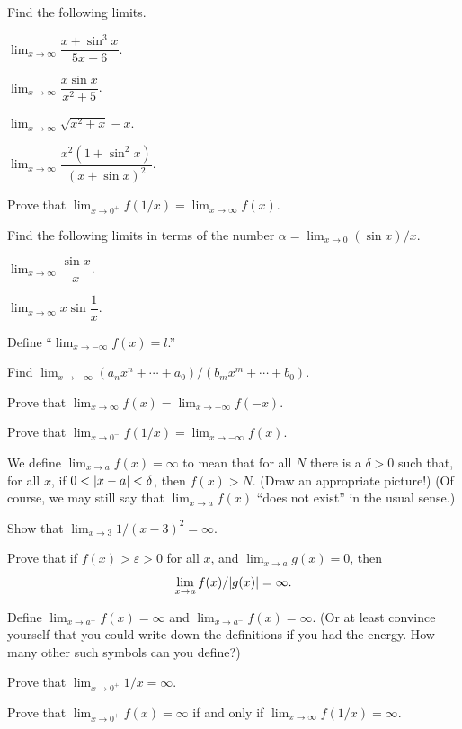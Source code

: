 Find the following limits.
\begin{romans}
\item $\displaystyle\lim_{x\to\infty}\dfrac{x+\sin^3 x}{5x+6}$.
\item $\displaystyle\lim_{x\to\infty}\dfrac{x\sin x}{x^2+5}$.
\item $\displaystyle\lim_{x\to\infty}\sqrt{x^2+x}-x$.
\item $\displaystyle\lim_{x\to\infty}\dfrac{x^2(1+\sin^2 x)}{(x+\sin x)^2}$.
\end{romans}

Prove that $\lim_{x\to 0^+}f(1/x)=\lim_{x\to\infty}f(x)$.

Find the following limits in terms of the number
$\alpha=\lim_{x\to 0}(\sin x)/x$.
\begin{romans}
\item $\displaystyle\lim_{x\to\infty}\dfrac{\sin x}{x}$.
\item $\displaystyle\lim_{x\to\infty}x\sin\dfrac{1}{x}$.
\end{romans}

Define ``$\lim_{x\to-\infty}f(x)=l$.''
\begin{letters}
\item Find $\lim_{x\to-\infty}(a_n x^n+\cdots+a_0)/(b_m x^m+\cdots+b_0)$.
\item Prove that $\lim_{x\to\infty}f(x)=\lim_{x\to-\infty}f(-x)$.
\item Prove that $\lim_{x\to 0^-}f(1/x)=\lim_{x\to-\infty}f(x)$.
\end{letters}

We define $\lim_{x\to a}f(x)=\infty$ to mean that for all $N$ there is a
$\delta>0$ such that, for all $x$, if $0<\lvert x-a\rvert<\delta$, then $f(x)>N$.
(Draw an appropriate picture!) (Of course, we may still say that
$\lim_{x\to a}f(x)$ ``does not exist'' in the usual sense.)
\begin{letters}
\item Show that $\lim_{x\to 3}1/(x-3)^2=\infty$.
\item Prove that if $f(x)>\varepsilon>0$ for all $x$, and
$\lim_{x\to a}g(x)=0$, then
\[
\lim_{x\to a}f(x)/\lvert g(x)\rvert=\infty.
\]
\end{letters}

\begin{letters}
\item Define $\lim_{x\to a^+}f(x)=\infty$ and
$\lim_{x\to a^-}f(x)=\infty$. (Or at least convince yourself that you could
write down the definitions if you had the energy. How many other such symbols
can you define?)
\item Prove that $\lim_{x\to 0^+}1/x=\infty$.
\item Prove that $\lim_{x\to 0^+}f(x)=\infty$ if and only if
$\lim_{x\to\infty}f(1/x)=\infty$.
\end{letters}

